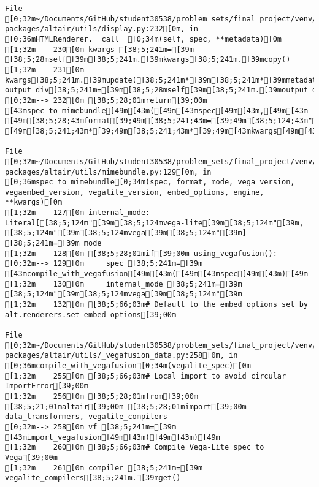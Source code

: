 \documentclass[
  letterpaper,
  DIV=11,
  numbers=noendperiod]{scrartcl}
\begin{document}
\begin{verbatim}
File [0;32m~/Documents/GitHub/student30538/problem_sets/final_project/venv/lib/python3.13/site-packages/altair/utils/display.py:232[0m, in [0;36mHTMLRenderer.__call__[0;34m(self, spec, **metadata)[0m
[1;32m    230[0m kwargs [38;5;241m=[39m [38;5;28mself[39m[38;5;241m.[39mkwargs[38;5;241m.[39mcopy()
[1;32m    231[0m kwargs[38;5;241m.[39mupdate([38;5;241m*[39m[38;5;241m*[39mmetadata, output_div[38;5;241m=[39m[38;5;28mself[39m[38;5;241m.[39moutput_div)
[0;32m--> 232[0m [38;5;28;01mreturn[39;00m [43mspec_to_mimebundle[49m[43m([49m[43mspec[49m[43m,[49m[43m [49m[38;5;28;43mformat[39;49m[38;5;241;43m=[39;49m[38;5;124;43m"[39;49m[38;5;124;43mhtml[39;49m[38;5;124;43m"[39;49m[43m,[49m[43m [49m[38;5;241;43m*[39;49m[38;5;241;43m*[39;49m[43mkwargs[49m[43m)[49m

File [0;32m~/Documents/GitHub/student30538/problem_sets/final_project/venv/lib/python3.13/site-packages/altair/utils/mimebundle.py:129[0m, in [0;36mspec_to_mimebundle[0;34m(spec, format, mode, vega_version, vegaembed_version, vegalite_version, embed_options, engine, **kwargs)[0m
[1;32m    127[0m internal_mode: Literal[[38;5;124m"[39m[38;5;124mvega-lite[39m[38;5;124m"[39m, [38;5;124m"[39m[38;5;124mvega[39m[38;5;124m"[39m] [38;5;241m=[39m mode
[1;32m    128[0m [38;5;28;01mif[39;00m using_vegafusion():
[0;32m--> 129[0m     spec [38;5;241m=[39m [43mcompile_with_vegafusion[49m[43m([49m[43mspec[49m[43m)[49m
[1;32m    130[0m     internal_mode [38;5;241m=[39m [38;5;124m"[39m[38;5;124mvega[39m[38;5;124m"[39m
[1;32m    132[0m [38;5;66;03m# Default to the embed options set by alt.renderers.set_embed_options[39;00m

File [0;32m~/Documents/GitHub/student30538/problem_sets/final_project/venv/lib/python3.13/site-packages/altair/utils/_vegafusion_data.py:258[0m, in [0;36mcompile_with_vegafusion[0;34m(vegalite_spec)[0m
[1;32m    255[0m [38;5;66;03m# Local import to avoid circular ImportError[39;00m
[1;32m    256[0m [38;5;28;01mfrom[39;00m [38;5;21;01maltair[39;00m [38;5;28;01mimport[39;00m data_transformers, vegalite_compilers
[0;32m--> 258[0m vf [38;5;241m=[39m [43mimport_vegafusion[49m[43m([49m[43m)[49m
[1;32m    260[0m [38;5;66;03m# Compile Vega-Lite spec to Vega[39;00m
[1;32m    261[0m compiler [38;5;241m=[39m vegalite_compilers[38;5;241m.[39mget()


\end{verbatim}
\end{document}
